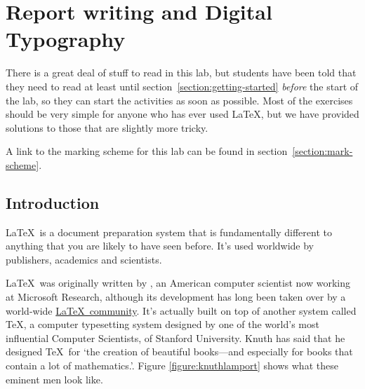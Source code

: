 



% 
\setlength{\parskip}{\parskipdefault}
\setlength{\parindent}{\parindentdefault}
\fancyheadoffset{0cm} %

\chapter{Report writing and Digital Typography}
\begin{refsection}
  
\minitoc


\begin{demonote}
  There is a great deal of stuff to read in this lab, but students
  have been told that they need to read at least until
  section~\ref{section:getting-started} \emph{before} the start of the
  lab, so they can start the activities as soon as possible. Most of
  the exercises should be very simple for anyone who has ever used
  \LaTeX, but we have provided solutions to those that are slightly
  more tricky.

  A link to the  marking scheme for this lab can be found in section~\ref{section:mark-scheme}.

\end{demonote}

\section{Introduction}

\LaTeX\ is a document preparation system that is fundamentally
different to anything that you are likely to have seen before. It's
used worldwide by publishers, academics and scientists.

\LaTeX\ was originally written by , an American computer scientist now working at Microsoft
Research, although its development has long been taken over by a
world-wide \href{http://www.latex-project.org}{\LaTeX\ community}.
It's actually built on top of another system called \TeX, a computer
typesetting system designed by one of the world's most influential
Computer Scientists,  of
Stanford University. Knuth has said that he designed \TeX\ for `the
creation of beautiful books---and especially for books that contain a
lot of mathematics.'\citep{knuth1984}. Figure
\ref{figure:knuthlamport} shows what these eminent men look like.


\end{refsection}
